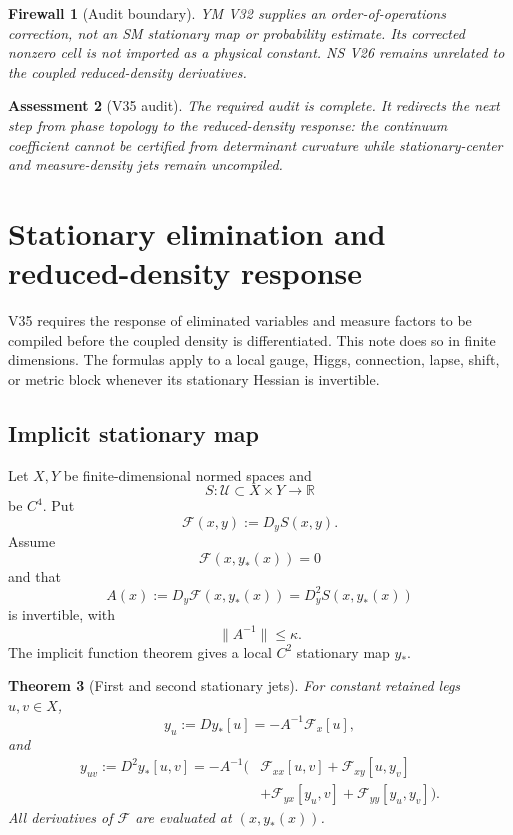 \documentclass[11pt]{article}
\newtheorem{theorem}{Theorem}[section]
\newtheorem{assessment}[theorem]{Assessment}
\newtheorem{firewall}[theorem]{Firewall}
\begin{document}
\begin{firewall}[Audit boundary]
\label{fw:v11v35-boundary}
YM V32 supplies an order-of-operations correction, not an SM
stationary map or probability estimate.  Its corrected nonzero cell is
not imported as a physical constant.  NS V26 remains unrelated to the
coupled reduced-density derivatives.
\end{firewall}

\begin{assessment}[V35 audit]
\label{ass:v11v35}
The required audit is complete.  It redirects the next step from phase
topology to the reduced-density response: the continuum coefficient
cannot be certified from determinant curvature while stationary-center
and measure-density jets remain uncompiled.
\end{assessment}
\section{Stationary elimination and reduced-density response}
\label{sec:v11v36}

V35 requires the response of eliminated variables and measure factors to
be compiled before the coupled density is differentiated.  This note
does so in finite dimensions.  The formulas apply to a local gauge,
Higgs, connection, lapse, shift, or metric block whenever its stationary
Hessian is invertible.

\subsection{Implicit stationary map}

Let \(X,Y\) be finite-dimensional normed spaces and
\[
 S:\mathcal U\subset X\times Y\longrightarrow\mathbb R
 \tag{36.1}
\]
be \(C^4\).  Put
\[
 \mathcal F(x,y):=D_yS(x,y).
 \tag{36.2}
\]
Assume
\[
 \mathcal F(x,y_*(x))=0
 \tag{36.3}
\]
and that
\[
 A(x):=D_y\mathcal F(x,y_*(x))
      =D_y^2S(x,y_*(x))
 \tag{36.4}
\]
is invertible, with
\[
 \|A^{-1}\|\leq\kappa.
 \tag{36.5}
\]
The implicit function theorem gives a local \(C^2\) stationary map
\(y_*\).

\begin{theorem}[First and second stationary jets]
\label{thm:v11v36-stationary-jets}
For constant retained legs \(u,v\in X\),
\[
 y_u:=
 Dy_*[u]
 =
 -A^{-1}\mathcal F_x[u],
 \tag{36.6}
\]
and
\[
 \begin{split}
 y_{uv}:=D^2y_*[u,v]
 =-A^{-1}\bigl(
 &\mathcal F_{xx}[u,v]
 +\mathcal F_{xy}[u,y_v]\\
 &+\mathcal F_{yx}[y_u,v]
 +\mathcal F_{yy}[y_u,y_v]
 \bigr).
 \end{split}
 \tag{36.7}
\]
All derivatives of \(\mathcal F\) are evaluated at
\((x,y_*(x))\).
\end{theorem}
\end{document}
